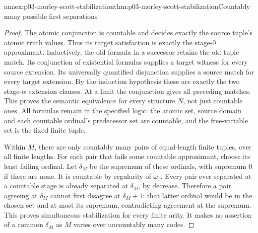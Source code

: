 \begin{annexitem}{annex:p03-morley-scott-stabilization}{thm:p03-morley-scott-stabilization}{Countably many possible first separations}
\begin{proof}
The atomic conjunction is countable and decides
exactly the source tuple's atomic truth values.
Thus its target satisfaction is exactly the
stage-\(0\) approximant.
Inductively, the old formula in a successor retains
the old tuple match. Its conjunction of existential
formulas supplies a target witness for every
source extension. Its universally quantified
disjunction supplies a source match for every
target extension. By the induction hypothesis
these are exactly the two stage-\(\alpha\)
extension clauses. At a limit the conjunction
gives all preceding matches.
This proves the semantic equivalence for every
structure \(N\), not just countable ones.
All formulas remain in the specified logic:
the atomic set, source domain and each countable
ordinal's predecessor set are countable, and the
free-variable set is the fixed finite tuple.

Within \(M\), there are only countably many pairs
of equal-length finite tuples, over all finite
lengths. For each pair that fails some countable
approximant, choose its least failing ordinal.
Let \(\delta_M\) be the supremum of these ordinals,
with supremum \(0\) if there are none.
It is countable by regularity of \(\omega_1\).
Every pair ever separated at a countable stage
is already separated at \(\delta_M\), by decrease.
Therefore a pair agreeing at \(\delta_M\) cannot
first disagree at \(\delta_M+1\): that latter
ordinal would be in the chosen set and at most
its supremum, contradicting agreement at the
supremum. This proves simultaneous stabilization
for every finite arity.
It makes no assertion of a common \(\delta_M\)
as \(M\) varies over uncountably many codes.
\end{proof}
\end{annexitem}

